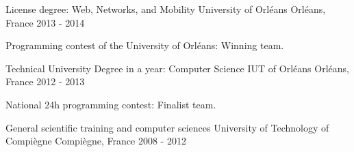 \begin{cventries}
  \cventry
    {License degree: Web, Networks, and Mobility}
    {University of Orléans}
    {Orléans, France}
    {2013 - 2014}
    {
      \begin{cvitems}
        \item {Programming contest of the University of Orléans: Winning team.}
      \end{cvitems}
    }
  \cventry
    {Technical University Degree in a year: Computer Science}
    {IUT of Orléans}
    {Orléans, France}
    {2012 - 2013}
    {
      \begin{cvitems}
        \item {National 24h programming contest: Finalist team.}
      \end{cvitems}
    }
  \cventry
    {General scientific training and computer sciences}
    {University of Technology of Compiègne}
    {Compiègne, France}
    {2008 - 2012}
    {}
\end{cventries}

